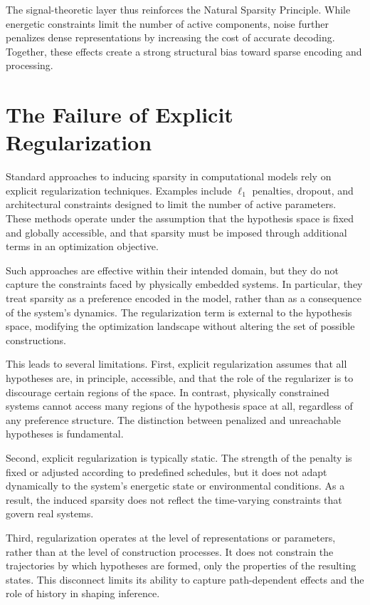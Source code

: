 \documentclass[12pt]{article}
\theoremstyle{plain}
\theoremstyle{definition}
\theoremstyle{remark}
\begin{document}
The signal-theoretic layer thus reinforces the Natural Sparsity Principle. While energetic constraints limit the number of active components, noise further penalizes dense representations by increasing the cost of accurate decoding. Together, these effects create a strong structural bias toward sparse encoding and processing.

\section{The Failure of Explicit Regularization}

Standard approaches to inducing sparsity in computational models rely on explicit regularization techniques. Examples include $\ell_1$ penalties, dropout, and architectural constraints designed to limit the number of active parameters. These methods operate under the assumption that the hypothesis space is fixed and globally accessible, and that sparsity must be imposed through additional terms in an optimization objective.

Such approaches are effective within their intended domain, but they do not capture the constraints faced by physically embedded systems. In particular, they treat sparsity as a preference encoded in the model, rather than as a consequence of the system's dynamics. The regularization term is external to the hypothesis space, modifying the optimization landscape without altering the set of possible constructions.

This leads to several limitations. First, explicit regularization assumes that all hypotheses are, in principle, accessible, and that the role of the regularizer is to discourage certain regions of the space. In contrast, physically constrained systems cannot access many regions of the hypothesis space at all, regardless of any preference structure. The distinction between penalized and unreachable hypotheses is fundamental.

Second, explicit regularization is typically static. The strength of the penalty is fixed or adjusted according to predefined schedules, but it does not adapt dynamically to the system's energetic state or environmental conditions. As a result, the induced sparsity does not reflect the time-varying constraints that govern real systems.

Third, regularization operates at the level of representations or parameters, rather than at the level of construction processes. It does not constrain the trajectories by which hypotheses are formed, only the properties of the resulting states. This disconnect limits its ability to capture path-dependent effects and the role of history in shaping inference.
\end{document}
